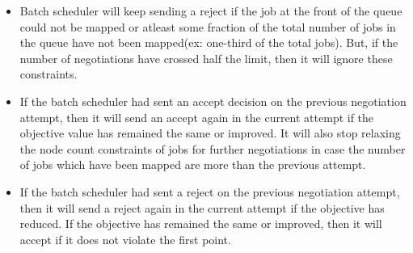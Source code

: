 \begin{itemize}
\item Batch scheduler will keep sending a reject if the job at the front of the queue could not be mapped or atleast some fraction of the total number of jobs in the queue have not been mapped(ex: one-third of the total jobs). But, if the number of negotiations have crossed half the limit, then it will ignore these constraints.
\item If the batch scheduler had sent an accept decision on the previous negotiation attempt, then it will send an accept again in the current attempt if the objective value has remained the same or improved. It will also stop relaxing the node count constraints of jobs for further negotiations in case the number of jobs which have been mapped are more than the previous attempt.
\item If the batch scheduler had sent a reject on the previous negotiation attempt, then it will send a reject again in the current attempt if the objective has reduced. If the objective has remained the same or improved, then it will accept if it does not violate the first point.
\end{itemize}
